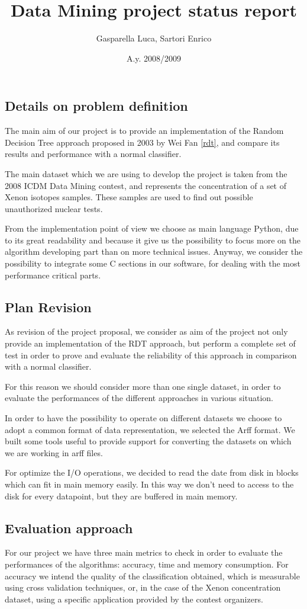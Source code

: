 \documentclass[12pt,a4paper]{article}
\title{Data Mining project status report}
\author{Gasparella Luca, Sartori Enrico}
\date{A.y. 2008/2009}
\begin{document}
\maketitle
\subsection*{Details on problem definition}
The main aim of our project is to provide an implementation of the Random
Decision Tree approach proposed in 2003 by Wei Fan \ref{rdt}, and compare
its results and performance with a normal classifier.

The main dataset which we are using to develop the project is taken from
the 2008 ICDM Data Mining contest, and represents the
concentration of a set of Xenon isotopes samples. These samples are used
to find out possible unauthorized nuclear tests.

From the implementation point of view we choose as main language Python,
due to its great readability and because it give us the possibility to
focus more on the algorithm developing part than on more technical issues.
Anyway, we consider the possibility to integrate some C sections in our
software, for dealing with the most performance critical parts.

\subsection*{Plan Revision}
As revision of the project proposal, we consider as aim of the project not
only provide an implementation of the RDT approach, but perform a complete
set of test in order to prove and evaluate the reliability of this
approach in comparison with a normal classifier.

For this reason we should consider more than one single dataset, in order
to evaluate the performances of the different approaches in various
situation.

In order to have the possibility to operate on different datasets we
choose to adopt a common format of data representation, we selected the
Arff format. We built some tools useful to provide support for converting
the datasets on which we are working in arff files.

For optimize the I/O operations, we decided to read the date from disk in
blocks which can fit in main memory easily. In this way we don't need to
access to the disk for every datapoint, but they are buffered in main
memory.   

\subsection*{Evaluation approach}
For our project we have three main metrics to check in order to evaluate
the performances of the algorithms: accuracy, time and memory consumption.
For accuracy we intend the quality of the classification obtained, which
is measurable using cross validation techniques, or, in the case of the
Xenon concentration dataset, using a specific application provided by the
contest organizers.
\end{document}
